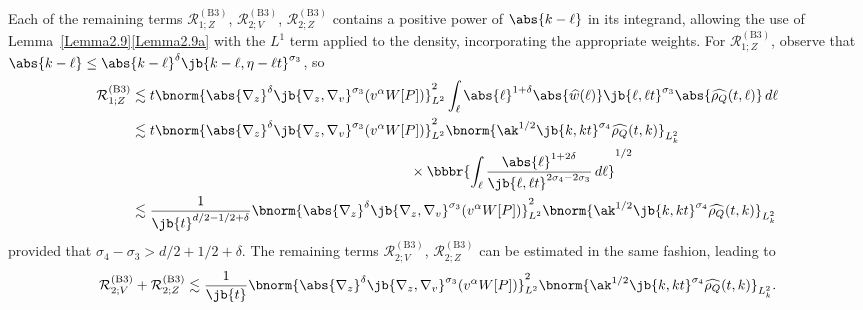 Each of the remaining terms $\mathcal{R}_{1;Z}^{\mathrm{(B3)}}$, $\mathcal{R}_{2;V}^{\mathrm{(B3)}}$, $\mathcal{R}_{2;Z}^{\mathrm{(B3)}}$ contains a positive power of $\abs{k-\ell }$ in its integrand, allowing the use of Lemma~\ref{Lemma2.9}\eqref{Lemma2.9a} with the $L^1$ term applied to the density, incorporating the appropriate weights. For $\mathcal{R}_{1;Z}^{\mathrm{(B3)}}$, observe that $\abs{k-\ell }\leq\abs{k-\ell }^{\delta}\jb{k-\ell ,\eta-\ell t}^{\sigma_3}$, so
\begin{align*}
\mathcal{R}_{1;Z}^{\mathrm{(B3)}}&\lesssim t\bnorm{\abs{\nabla_z}^\delta\jb{\nabla_z,\nabla_v}^{\sigma_3}(v^\alpha W[P])}_{L^2}^2\int_\ell \abs{\ell }^{1+\delta}\abs{\widehat w(\ell )}\jb{\ell ,\ell t}^{\sigma_3}\abs{\widehat{\rho_Q}(t,\ell )}\,d\ell \\
&\lesssim t\bnorm{\abs{\nabla_z}^\delta\jb{\nabla_z,\nabla_v}^{\sigma_3}(v^\alpha W[P])}_{L^2}^2\bnorm{\ak^{1/2}\jb{k,kt}^{\sigma_4}\widehat{\rho_Q}(t,k)}_{L^2_k}\\
&\hspace*{7cm}\times\bbbr{\int_\ell \frac{\abs{\ell }^{1+2\delta}}{\jb{\ell ,\ell t}^{2\sigma_4-2\sigma_3}}\,d\ell }^{1/2}\\
&\lesssim\frac{1}{\jb{t}^{{d/2}-1/2+\delta}}\bnorm{\abs{\nabla_z}^\delta\jb{\nabla_z,\nabla_v}^{\sigma_3}(v^\alpha W[P])}_{L^2}^2\bnorm{\ak^{1/2}\jb{k,kt}^{\sigma_4}\widehat{\rho_Q}(t,k)}_{L^2_k}
\end{align*}
provided that $\sigma_4-\sigma_3>d/2+1/2+\delta$.
The remaining terms $\mathcal{R}_{2;V}^{\mathrm{(B3)}}$, $\mathcal{R}_{2;Z}^{\mathrm{(B3)}}$ can be estimated in the same fashion, leading to
\begin{align*}
\mathcal{R}_{2;V}^{\mathrm{(B3)}}+\mathcal{R}_{2;Z}^{\mathrm{(B3)}}\lesssim\frac{1}{\jb{t}}\bnorm{\abs{\nabla_z}^\delta\jb{\nabla_z,\nabla_v}^{\sigma_3}(v^\alpha W[P])}_{L^2}^2\bnorm{\ak^{1/2}\jb{k,kt}^{\sigma_4}\widehat{\rho_Q}(t,k)}_{L^2_k}.
\end{align*}

